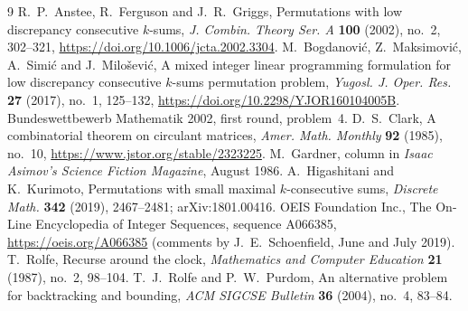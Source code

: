 \documentclass[11pt]{amsart}
\theoremstyle{remark}
\begin{document}
\begin{thebibliography}{9}
 R.~P.~Anstee, R.~Ferguson and J.~R.~Griggs, Permutations with low discrepancy consecutive $k$-sums,
\emph{J. Combin. Theory Ser. A} \textbf{100} (2002), no.~2, 302--321, \url{https://doi.org/10.1006/jcta.2002.3304}.
 M.~Bogdanovi\'c, Z.~Maksimovi\'c, A.~Simi\'c and J.~Milo\v{s}evi\'c, A mixed integer linear
programming formulation for low discrepancy consecutive $k$-sums permutation problem, \emph{Yugosl. J. Oper. Res.}
\textbf{27} (2017), no.~1, 125--132, \url{https://doi.org/10.2298/YJOR160104005B}.
 Bundeswettbewerb Mathematik 2002, first round, problem~4.
 D.~S.~Clark, A combinatorial theorem on circulant matrices, \emph{Amer. Math. Monthly} \textbf{92}
(1985), no.~10, \url{https://www.jstor.org/stable/2323225}.
 M.~Gardner, column in \emph{Isaac Asimov's Science Fiction Magazine}, August 1986.
 A.~Higashitani and K.~Kurimoto, Permutations with small maximal $k$-consecutive sums,
\emph{Discrete Math.} \textbf{342} (2019), 2467--2481; arXiv:1801.00416.
 OEIS Foundation Inc., The On-Line Encyclopedia of Integer Sequences, sequence A066385,
\url{https://oeis.org/A066385} (comments by J.~E.~Schoenfield, June and July 2019).
 T.~Rolfe, Recurse around the clock, \emph{Mathematics and Computer Education} \textbf{21} (1987),
no.~2, 98--104.
 T.~J.~Rolfe and P.~W.~Purdom, An alternative problem for backtracking and bounding,
\emph{ACM SIGCSE Bulletin} \textbf{36} (2004), no.~4, 83--84.
\end{thebibliography}
\end{document}
